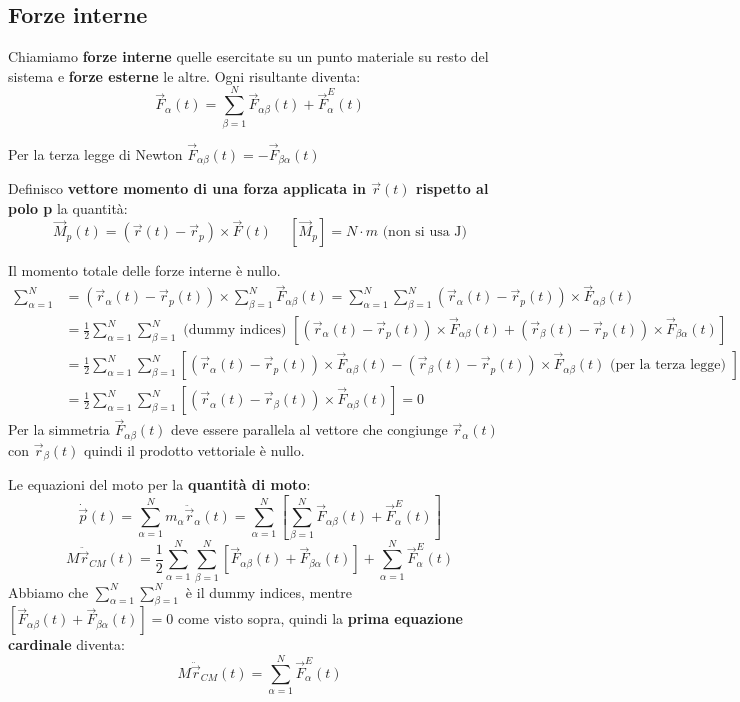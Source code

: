 \subsection{Forze interne}
Chiamiamo \textbf{forze interne} quelle esercitate su un punto materiale su resto del sistema e \textbf{forze esterne} le altre. Ogni
risultante diventa:
$$\vec{F}_{\alpha}(t) = \sum_{\beta=1}^{N} \vec{F}_{\alpha\beta}(t) + \vec{F}_{\alpha}^{E}(t)$$
\begin{observation}
    Per la terza legge di Newton $\vec{F}_{\alpha\beta}(t) = -\vec{F}_{\beta\alpha}(t)$
\end{observation}
\hspace{-15pt}Definisco \textbf{vettore momento di una forza applicata in $\vec{r}(t)$ rispetto al polo p} la quantità:
$$\vec{M}_p(t) = (\vec{r}(t) - \vec{r}_p) \times \vec{F}(t) \hspace{15pt}[\vec{M}_p] = N \cdot m \text{ (non si usa J)}$$
\begin{observation}
    Il momento totale delle forze interne è nullo.
    \begin{equation*}
        \begin{split}
            \sum_{\alpha=1}^{N} & = (\vec{r}_{\alpha}(t) - \vec{r}_p(t)) \times \sum_{\beta=1}^{N}\vec{F}_{\alpha\beta}(t) = \sum_{\alpha=1}^{N} \sum_{\beta=1}^{N} (\vec{r}_{\alpha}(t) - \vec{r}_p(t)) \times \vec{F}_{\alpha\beta}(t)\\
                                & = \frac{1}{2}\sum_{\alpha=1}^{N}\sum_{\beta=1}^{N} \text{ (dummy indices) }[(\vec{r}_{\alpha}(t) - \vec{r}_p(t)) \times \vec{F}_{\alpha\beta}(t) + (\vec{r}_{\beta}(t) - \vec{r}_p(t)) \times \vec{F}_{\beta\alpha}(t)]\\
                                & = \frac{1}{2}\sum_{\alpha=1}^{N}\sum_{\beta=1}^{N}[(\vec{r}_{\alpha}(t) - \vec{r}_p(t)) \times \vec{F}_{\alpha\beta}(t) - (\vec{r}_{\beta}(t) - \vec{r}_p(t)) \times \vec{F}_{\alpha\beta}(t) \text{ (per la terza legge) }]\\
                                & = \frac{1}{2}\sum_{\alpha=1}^{N}\sum_{\beta=1}^{N}[(\vec{r}_{\alpha}(t) - \vec{r}_{\beta}(t)) \times \vec{F}_{\alpha\beta}(t)] = 0
        \end{split}
    \end{equation*}
    Per la simmetria $\vec{F}_{\alpha\beta}(t)$ deve essere parallela al vettore che congiunge $\vec{r}_{\alpha}(t)$ con $\vec{r}_{\beta}(t)$ quindi il prodotto vettoriale è nullo.
\end{observation}
\hspace{-15pt}Le equazioni del moto per la \textbf{quantità di moto}:
$$\dot{\vec{p}}(t) = \sum_{\alpha=1}^{N} m_{\alpha}\ddot{\vec{r}}_{\alpha}(t) = \sum_{\alpha=1}^{N}[\sum_{\beta=1}^{N}\vec{F}_{\alpha\beta}(t) + \vec{F}_{\alpha}^E(t)]$$
$$M\ddot{\vec{r}}_{CM}(t) = \frac{1}{2}\sum_{\alpha=1}^{N}\sum_{\beta=1}^{N}[\vec{F}_{\alpha\beta}(t) + \vec{F}_{\beta\alpha}(t)] + \sum_{\alpha=1}^{N}\vec{F}_{\alpha}^E(t)$$
Abbiamo che $\sum_{\alpha=1}^{N}\sum_{\beta=1}^{N}$ è il dummy indices, mentre $[\vec{F}_{\alpha\beta}(t) + \vec{F}_{\beta\alpha}(t)] = 0$ come visto sopra, quindi la \textbf{prima equazione cardinale} diventa:
$$M\ddot{\vec{r}}_{CM}(t) = \sum_{\alpha=1}^{N}\vec{F}_{\alpha}^E(t)$$

